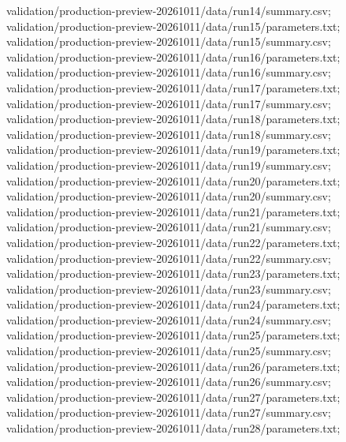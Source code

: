 validation/\allowbreak{}production-preview-20261011/\allowbreak{}data/\allowbreak{}run14/\allowbreak{}summary.csv; validation/\allowbreak{}production-preview-20261011/\allowbreak{}data/\allowbreak{}run15/\allowbreak{}parameters.txt; validation/\allowbreak{}production-preview-20261011/\allowbreak{}data/\allowbreak{}run15/\allowbreak{}summary.csv; validation/\allowbreak{}production-preview-20261011/\allowbreak{}data/\allowbreak{}run16/\allowbreak{}parameters.txt; validation/\allowbreak{}production-preview-20261011/\allowbreak{}data/\allowbreak{}run16/\allowbreak{}summary.csv; validation/\allowbreak{}production-preview-20261011/\allowbreak{}data/\allowbreak{}run17/\allowbreak{}parameters.txt; validation/\allowbreak{}production-preview-20261011/\allowbreak{}data/\allowbreak{}run17/\allowbreak{}summary.csv; validation/\allowbreak{}production-preview-20261011/\allowbreak{}data/\allowbreak{}run18/\allowbreak{}parameters.txt; validation/\allowbreak{}production-preview-20261011/\allowbreak{}data/\allowbreak{}run18/\allowbreak{}summary.csv; validation/\allowbreak{}production-preview-20261011/\allowbreak{}data/\allowbreak{}run19/\allowbreak{}parameters.txt; validation/\allowbreak{}production-preview-20261011/\allowbreak{}data/\allowbreak{}run19/\allowbreak{}summary.csv; validation/\allowbreak{}production-preview-20261011/\allowbreak{}data/\allowbreak{}run20/\allowbreak{}parameters.txt; validation/\allowbreak{}production-preview-20261011/\allowbreak{}data/\allowbreak{}run20/\allowbreak{}summary.csv; validation/\allowbreak{}production-preview-20261011/\allowbreak{}data/\allowbreak{}run21/\allowbreak{}parameters.txt; validation/\allowbreak{}production-preview-20261011/\allowbreak{}data/\allowbreak{}run21/\allowbreak{}summary.csv; validation/\allowbreak{}production-preview-20261011/\allowbreak{}data/\allowbreak{}run22/\allowbreak{}parameters.txt; validation/\allowbreak{}production-preview-20261011/\allowbreak{}data/\allowbreak{}run22/\allowbreak{}summary.csv; validation/\allowbreak{}production-preview-20261011/\allowbreak{}data/\allowbreak{}run23/\allowbreak{}parameters.txt; validation/\allowbreak{}production-preview-20261011/\allowbreak{}data/\allowbreak{}run23/\allowbreak{}summary.csv; validation/\allowbreak{}production-preview-20261011/\allowbreak{}data/\allowbreak{}run24/\allowbreak{}parameters.txt; validation/\allowbreak{}production-preview-20261011/\allowbreak{}data/\allowbreak{}run24/\allowbreak{}summary.csv; validation/\allowbreak{}production-preview-20261011/\allowbreak{}data/\allowbreak{}run25/\allowbreak{}parameters.txt; validation/\allowbreak{}production-preview-20261011/\allowbreak{}data/\allowbreak{}run25/\allowbreak{}summary.csv; validation/\allowbreak{}production-preview-20261011/\allowbreak{}data/\allowbreak{}run26/\allowbreak{}parameters.txt; validation/\allowbreak{}production-preview-20261011/\allowbreak{}data/\allowbreak{}run26/\allowbreak{}summary.csv; validation/\allowbreak{}production-preview-20261011/\allowbreak{}data/\allowbreak{}run27/\allowbreak{}parameters.txt; validation/\allowbreak{}production-preview-20261011/\allowbreak{}data/\allowbreak{}run27/\allowbreak{}summary.csv; validation/\allowbreak{}production-preview-20261011/\allowbreak{}data/\allowbreak{}run28/\allowbreak{}parameters.txt; 